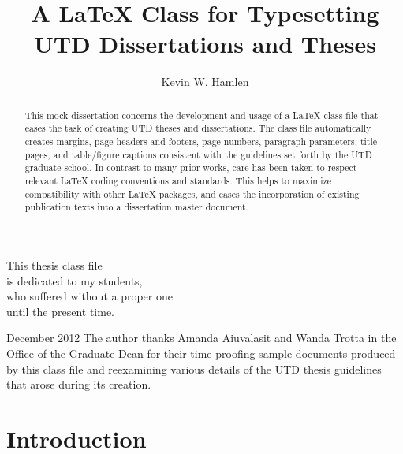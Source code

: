 \documentclass[doublespacing]{utdthesis}
\author{Kevin W. Hamlen}
\title{A LaTeX Class for Typesetting \\ UTD Dissertations and Theses}
\begin{document}
\frontmatter

\signaturepage
{} %

\begin{dedication} %
This thesis class file \\
is dedicated to my students, \\
who suffered without a proper one \\
until the present time.
\end{dedication}

\maketitle

\begin{acks}{December 2012} %
The author thanks Amanda Aiuvalasit and Wanda Trotta in the Office of the
Graduate Dean for their time proofing sample documents produced by this
class file and reexamining various details of the UTD thesis guidelines
that arose during its creation.
\end{acks}

\begin{preface} %
\prefacetext
\end{preface}

\begin{abstract}
This mock dissertation concerns the development and usage of a \LaTeX{}
class file that eases the task of creating UTD theses and dissertations.
The class file automatically creates margins, page headers and footers, page
numbers, paragraph parameters, title pages, and table/figure captions
consistent with the guidelines set forth by the UTD graduate school.
In contrast to many prior works, care has been taken to respect relevant
\LaTeX{} coding conventions and standards.
This helps to maximize compatibility with other \LaTeX{} packages, and
eases the incorporation of existing publication texts into a dissertation
master document.
\end{abstract}

\tableofcontents
\listoffigures %
\listoftables %

\mainmatter

\chapter{Introduction}
\label{c:intro}
\end{document}

